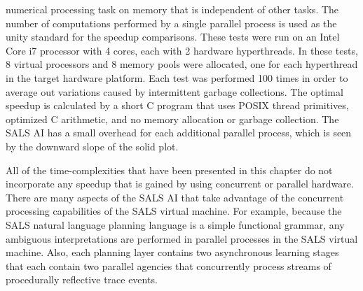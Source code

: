 numerical processing task on memory that is independent of other
tasks.  The number of computations performed by a single parallel
process is used as the unity standard for the speedup comparisons.
These tests were run on an Intel Core i7 processor with 4 cores, each
with 2 hardware hyperthreads.  In these tests, 8 virtual processors
and 8 memory pools were allocated, one for each hyperthread in the
target hardware platform.  Each test was performed 100 times in order
to average out variations caused by intermittent garbage collections.
The optimal speedup is calculated by a short C program that uses POSIX
thread primitives, optimized C arithmetic, and no memory allocation or
garbage collection.  The SALS AI has a small overhead for each
additional parallel process, which is seen by the downward slope of
the solid plot.

All of the time-complexities that have been presented in this chapter
do not incorporate any speedup that is gained by using concurrent or
parallel hardware.  There are many aspects of the SALS AI that take
advantage of the concurrent processing capabilities of the SALS
virtual machine.  For example, because the SALS natural language
planning language is a simple functional grammar, any ambiguous
interpretations are performed in parallel processes in the SALS
virtual machine.  Also, each planning layer contains two asynchronous
learning stages that each contain two parallel agencies that
concurrently process streams of procedurally reflective trace events.



